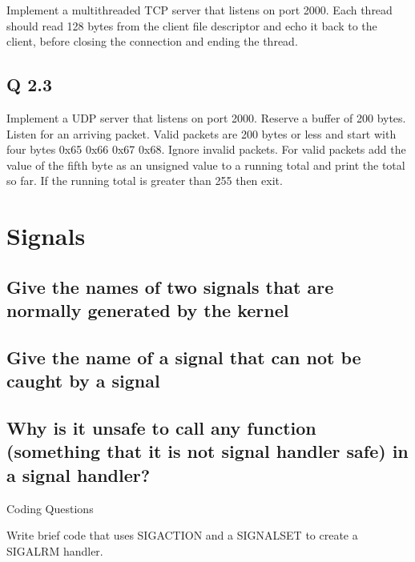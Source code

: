 Implement a multithreaded TCP server that listens on port 2000. Each thread should read 128 bytes from the client file descriptor and echo it back to the client, before closing the connection and ending the thread.

\subsection{Q 2.3}\label{q-2.3}

Implement a UDP server that listens on port 2000. Reserve a buffer of 200 bytes. Listen for an arriving packet. Valid packets are 200 bytes or less and start with four bytes 0x65 0x66 0x67 0x68. Ignore invalid packets. For valid packets add the value of the fifth byte as an unsigned value to a running total and print the total so far. If the running total is greater than 255 then exit.

\section{Signals}

\subsection{Give the names of two signals that are normally generated by the kernel}\label{give-the-names-of-two-signals-that-are-normally-generated-by-the-kernel}

\subsection{Give the name of a signal that can not be caught by a signal}\label{give-the-name-of-a-signal-that-can-not-be-caught-by-a-signal}

\subsection{Why is it unsafe to call any function (something that it is not signal handler safe) in a signal handler?}\label{why-is-it-unsafe-to-call-any-function-something-that-it-is-not-signal-handler-safe-in-a-signal-handler}

Coding Questions

Write brief code that uses SIGACTION and a SIGNALSET to create a SIGALRM handler.
